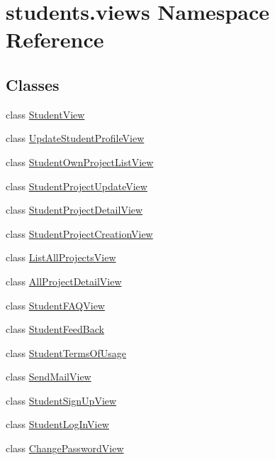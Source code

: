 \hypertarget{namespacestudents_1_1views}{\section{students.\-views Namespace Reference}
\label{namespacestudents_1_1views}
}
\subsection*{Classes}
\begin{DoxyCompactItemize}
\item 
class \hyperlink{classstudents_1_1views_1_1_student_view}{Student\-View}
\item 
class \hyperlink{classstudents_1_1views_1_1_update_student_profile_view}{Update\-Student\-Profile\-View}
\item 
class \hyperlink{classstudents_1_1views_1_1_student_own_project_list_view}{Student\-Own\-Project\-List\-View}
\item 
class \hyperlink{classstudents_1_1views_1_1_student_project_update_view}{Student\-Project\-Update\-View}
\item 
class \hyperlink{classstudents_1_1views_1_1_student_project_detail_view}{Student\-Project\-Detail\-View}
\item 
class \hyperlink{classstudents_1_1views_1_1_student_project_creation_view}{Student\-Project\-Creation\-View}
\item 
class \hyperlink{classstudents_1_1views_1_1_list_all_projects_view}{List\-All\-Projects\-View}
\item 
class \hyperlink{classstudents_1_1views_1_1_all_project_detail_view}{All\-Project\-Detail\-View}
\item 
class \hyperlink{classstudents_1_1views_1_1_student_f_a_q_view}{Student\-F\-A\-Q\-View}
\item 
class \hyperlink{classstudents_1_1views_1_1_student_feed_back}{Student\-Feed\-Back}
\item 
class \hyperlink{classstudents_1_1views_1_1_student_terms_of_usage}{Student\-Terms\-Of\-Usage}
\item 
class \hyperlink{classstudents_1_1views_1_1_send_mail_view}{Send\-Mail\-View}
\item 
class \hyperlink{classstudents_1_1views_1_1_student_sign_up_view}{Student\-Sign\-Up\-View}
\item 
class \hyperlink{classstudents_1_1views_1_1_student_log_in_view}{Student\-Log\-In\-View}
\item 
class \hyperlink{classstudents_1_1views_1_1_change_password_view}{Change\-Password\-View}
\end{DoxyCompactItemize}
